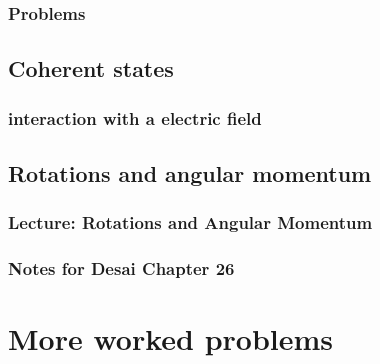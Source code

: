       \section{Problems}
         

   \chapter{Coherent states}
      \section{interaction with a electric field}
         

   \chapter{Rotations and angular momentum}
      \section{Lecture: Rotations and Angular Momentum}
         
      \section{Notes for Desai Chapter 26}
         

%      

\part{More worked problems}
   
   
   
   
   
   
   
